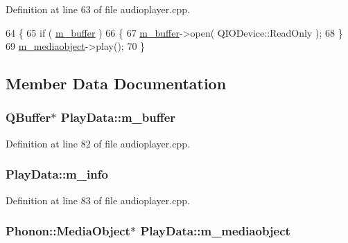 Definition at line 63 of file audioplayer.\+cpp.


\begin{DoxyCode}
64     \{
65         \textcolor{keywordflow}{if} ( \hyperlink{classPlayData_ab98af8c9abd9cd1a3b11cfa6d969284a}{m\_buffer} )
66         \{
67             \hyperlink{classPlayData_ab98af8c9abd9cd1a3b11cfa6d969284a}{m\_buffer}->open( QIODevice::ReadOnly );
68         \}
69         \hyperlink{classPlayData_a1ba72cd22230406764d16de62c5b32a6}{m\_mediaobject}->play();
70     \}
\end{DoxyCode}


\subsection{Member Data Documentation}
\hypertarget{classPlayData_ab98af8c9abd9cd1a3b11cfa6d969284a}{
\subsubsection[{m\+\_\+buffer}]{\setlength{\rightskip}{0pt plus 5cm}Q\+Buffer$\ast$ Play\+Data\+::m\+\_\+buffer}}\label{classPlayData_ab98af8c9abd9cd1a3b11cfa6d969284a}


Definition at line 82 of file audioplayer.\+cpp.

\hypertarget{classPlayData_a60f9f37739df694ec4c185ec0c7d4666}{
\subsubsection[{m\+\_\+info}]{ Play\+Data\+::m\+\_\+info}}\label{classPlayData_a60f9f37739df694ec4c185ec0c7d4666}


Definition at line 83 of file audioplayer.\+cpp.

\hypertarget{classPlayData_a1ba72cd22230406764d16de62c5b32a6}{
\subsubsection[{m\+\_\+mediaobject}]{\setlength{\rightskip}{0pt plus 5cm}Phonon\+::\+Media\+Object$\ast$ Play\+Data\+::m\+\_\+mediaobject}}\label{classPlayData_a1ba72cd22230406764d16de62c5b32a6}


